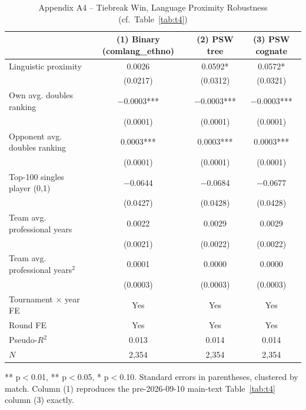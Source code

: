 \documentclass[10pt]{article}
\begin{document}
\begin{table}[htbp]
\centering
\caption{Appendix A4 -- Tiebreak Win, Language Proximity Robustness (cf.\ Table~\ref{tab:t4}) \label{tab:a4}}
\begin{threeparttable}
\begin{tabular}{lccc}
\toprule
 & (1) Binary (comlang\_ethno) & (2) PSW tree & (3) PSW cognate \\
\midrule
Linguistic proximity & 0.0026 & 0.0592* & 0.0572* \\
 & (0.0217) & (0.0312) & (0.0321) \\
Own avg. doubles ranking & $-$0.0003*** & $-$0.0003*** & $-$0.0003*** \\
 & (0.0001) & (0.0001) & (0.0001) \\
Opponent avg. doubles ranking & 0.0003*** & 0.0003*** & 0.0003*** \\
 & (0.0001) & (0.0001) & (0.0001) \\
Top-100 singles player (0,1) & $-$0.0644 & $-$0.0684 & $-$0.0677 \\
 & (0.0427) & (0.0428) & (0.0428) \\
Team avg. professional years & 0.0022 & 0.0029 & 0.0029 \\
 & (0.0021) & (0.0022) & (0.0022) \\
Team avg. professional years$^2$ & 0.0001 & 0.0000 & 0.0000 \\
 & (0.0003) & (0.0003) & (0.0003) \\
\midrule
Tournament $\times$ year FE & Yes & Yes & Yes \\
Round FE & Yes & Yes & Yes \\
Pseudo-$R^2$ & 0.013 & 0.014 & 0.014 \\
$N$ & 2,354 & 2,354 & 2,354 \\
\bottomrule
\end{tabular}
\begin{tablenotes}
\small
\item *** p$<$0.01, ** p$<$0.05, * p$<$0.10. Standard errors in parentheses, clustered by match. Column (1) reproduces the pre-2026-09-10 main-text Table~\ref{tab:t4} column (3) exactly.
\end{tablenotes}
\end{threeparttable}
\end{table}
\end{document}
